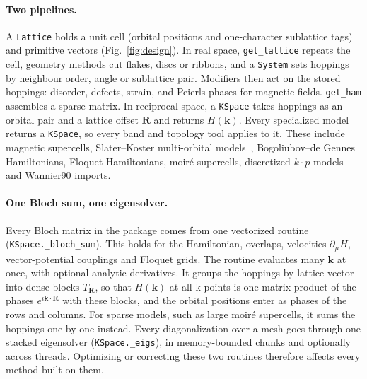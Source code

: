\documentclass[submission, Phys]{SciPost}
\newcommand{\code}[1]{\texttt{#1}}
\begin{document}
\paragraph{Two pipelines.} A \code{Lattice} holds a unit cell (orbital
positions and one-character sublattice tags) and primitive vectors
(Fig.~\ref{fig:design}). In real space, \code{get\_lattice} repeats the cell, geometry methods
cut flakes, discs or ribbons, and a \code{System} sets hoppings by neighbour
order, angle or sublattice pair. Modifiers then act on the stored
hoppings: disorder, defects, strain, and Peierls phases for magnetic fields.
\code{get\_ham} assembles a sparse matrix. In reciprocal space, a
\code{KSpace} takes hoppings as an orbital pair and a lattice offset
$\mathbf{R}$ and returns $H(\mathbf{k})$. Every specialized model returns a
\code{KSpace}, so every band and topology tool applies to it. These include
magnetic supercells, Slater--Koster multi-orbital models~\cite{slater1954},
Bogoliubov--de Gennes Hamiltonians, Floquet Hamiltonians, moir\'e
supercells, discretized $k\cdot p$ models and Wannier90 imports.

\paragraph{One Bloch sum, one eigensolver.} Every Bloch matrix in the package
comes from one vectorized routine (\code{KSpace.\_bloch\_sum}). This holds
for the Hamiltonian, overlaps, velocities $\partial_\mu H$, vector-potential
couplings and Floquet grids. The routine evaluates many $\mathbf{k}$ at once,
with optional analytic derivatives. It groups the hoppings by lattice
vector into dense blocks $T_{\mathbf{R}}$, so that $H(\mathbf{k})$ at all
k-points is one matrix product of the phases $e^{i\mathbf{k}\cdot\mathbf{R}}$
with these blocks, and the orbital positions enter as phases of the rows
and columns. For sparse models, such as large moir\'e supercells, it
sums the hoppings one by one instead. Every diagonalization over a mesh
goes through one stacked eigensolver (\code{KSpace.\_eigs}), in
memory-bounded chunks and optionally across threads. Optimizing or
correcting these two routines therefore affects every method built on
them.
\end{document}
